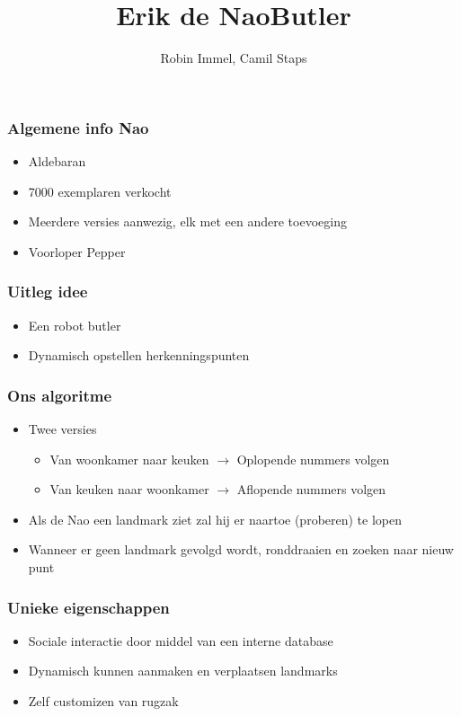 \documentclass[]{beamerruhuisstijl}
\title{Erik de NaoButler}
\author{Robin Immel, Camil Staps}
\begin{document}
  \frame{\titlepage}

  \begin{frame}
    \frametitle{Algemene info Nao}
        \begin{itemize}
	\item Aldebaran
	\item 7000 exemplaren verkocht
	\item Meerdere versies aanwezig, elk met een andere toevoeging
	\item Voorloper Pepper	
    \end{itemize}
  \end{frame}

  \begin{frame}
    \frametitle{Uitleg idee}
        \begin{itemize}
	\item Een robot butler
	\item Dynamisch opstellen herkenningspunten
    \end{itemize}
  \end{frame}

  \begin{frame}
    \frametitle{Ons algoritme}
        \begin{itemize}
	\item Twee versies
		 \begin{itemize}
			\item Van woonkamer naar keuken $\to$ Oplopende nummers volgen
			\item Van keuken naar woonkamer $\to$ Aflopende nummers volgen
  	        \end{itemize}
  	\item Als de Nao een landmark ziet zal hij er naartoe (proberen) te lopen
	\item Wanneer er geen landmark gevolgd wordt, ronddraaien en zoeken naar nieuw punt 
	
    \end{itemize}
  \end{frame}
  
\begin{frame}
    \frametitle{Unieke eigenschappen}
	\begin{itemize}
	\item Sociale interactie door middel van een interne database
	\item Dynamisch kunnen aanmaken en verplaatsen landmarks
	\item Zelf customizen van rugzak
    \end{itemize}
  \end{frame}
\end{document}
